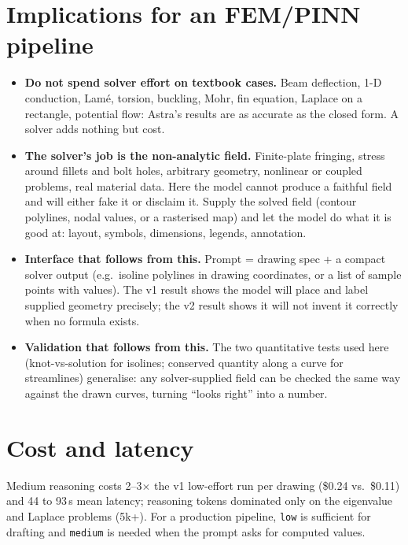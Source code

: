 \documentclass[11pt,a4paper]{article}
\begin{document}
\section{Implications for an FEM/PINN pipeline}
\begin{itemize}
  \item \textbf{Do not spend solver effort on textbook cases.} Beam deflection, 1-D conduction, Lam\'e, torsion, buckling, Mohr, fin equation, Laplace on a rectangle, potential flow: Astra's results are as accurate as the closed form. A solver adds nothing but cost.
  \item \textbf{The solver's job is the non-analytic field.} Finite-plate fringing, stress around fillets and bolt holes, arbitrary geometry, nonlinear or coupled problems, real material data. Here the model cannot produce a faithful field and will either fake it or disclaim it. Supply the solved field (contour polylines, nodal values, or a rasterised map) and let the model do what it is good at: layout, symbols, dimensions, legends, annotation.
  \item \textbf{Interface that follows from this.} Prompt = drawing spec + a compact solver output (e.g.\ isoline polylines in drawing coordinates, or a list of sample points with values). The v1 result shows the model will place and label supplied geometry precisely; the v2 result shows it will not invent it correctly when no formula exists.
  \item \textbf{Validation that follows from this.} The two quantitative tests used here (knot-vs-solution for isolines; conserved quantity along a curve for streamlines) generalise: any solver-supplied field can be checked the same way against the drawn curves, turning ``looks right'' into a number.
\end{itemize}

\section{Cost and latency}
Medium reasoning costs 2--3$\times$ the v1 low-effort run per drawing (\$0.24 vs.\ \$0.11) and 44 to 93\,s mean latency; reasoning tokens dominated only on the eigenvalue and Laplace problems (5k+). For a production pipeline, \texttt{low} is sufficient for drafting and \texttt{medium} is needed when the prompt asks for computed values.

\appendix
\end{document}
